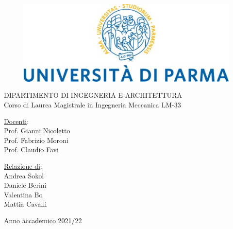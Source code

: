 
\begin{center}
    \begin{figure}[h]
        \centering
        \includegraphics[scale=0.7]{Immagini/logo.jpg}
      
    \end{figure}
    \vspace{0.5cm}
    \centering
    DIPARTIMENTO DI INGEGNERIA E ARCHITETTURA
\\
\vspace{0.5cm}
\centering
Corso di Laurea Magistrale in Ingegneria Meccanica LM-33\\
\vspace{0.5cm}
\end{center}
\vspace{1cm}
\underline{Docenti}:\\
Prof. Gianni Nicoletto\\
Prof. Fabrizio Moroni\\
Prof. Claudio Favi\\
\begin{flushright}
\underline{Relazione di}: \\
Andrea Sokol\\
Daniele Berini\\
Valentina Bo\\
Mattia Cavalli\\
\end{flushright}
\vspace{0.5cm}
\begin{center}
   Anno accademico 2021/22 
\end{center}